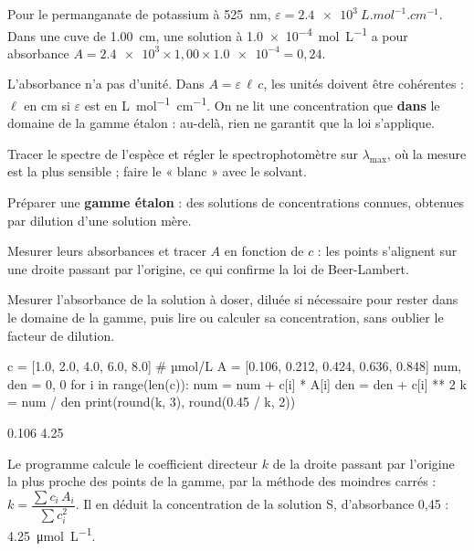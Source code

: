 \begin{exemple}
Pour le permanganate de potassium à \qty{525}{nm}, $\varepsilon=\qty{2,4e3}{L.mol^{-1}.cm^{-1}}$. Dans une cuve de \qty{1,00}{cm}, une solution à \qty{1,0e-4}{mol.L^{-1}}
a pour absorbance $A=\num{2.4e3}\times1{,}00\times\num{1.0e-4}=0{,}24$.
\end{exemple}
\begin{attention}
L'absorbance n'a pas d'unité. Dans $A=\varepsilon\,\ell\,c$, les unités doivent être cohérentes : $\ell$ en cm si $\varepsilon$ est en \unit{L.mol^{-1}.cm^{-1}}. On
ne lit une concentration que \textbf{dans} le domaine de la gamme étalon : au-delà, rien ne garantit que la loi s'applique.
\end{attention}
\begin{savoirfaire}
\begin{questions}
\item Tracer le spectre de l'espèce et régler le spectrophotomètre sur $\lambda_{\max}$, où la mesure est la plus sensible ;
faire le « blanc » avec le solvant.
\item Préparer une \textbf{gamme étalon} : des solutions de concentrations connues, obtenues par dilution d'une solution mère.
\item Mesurer leurs absorbances et tracer $A$ en fonction de $c$ : les points s'alignent sur une droite passant par l'origine,
ce qui confirme la loi de Beer-Lambert.
\item Mesurer l'absorbance de la solution à doser, diluée si nécessaire pour rester dans le domaine de la gamme, puis lire
ou calculer sa concentration, sans oublier le facteur de dilution.
\end{questions}
\end{savoirfaire}
\begin{codecote}[0.62]
\begin{pythoncol}
c = [1.0, 2.0, 4.0, 6.0, 8.0]        # µmol/L
A = [0.106, 0.212, 0.424, 0.636, 0.848]
num, den = 0, 0
for i in range(len(c)):
    num = num + c[i] * A[i]
    den = den + c[i] ** 2
k = num / den
print(round(k, 3), round(0.45 / k, 2))
\end{pythoncol}
\begin{consolecol}
0.106 4.25
\end{consolecol}
\cote
\fontsize{9.5}{12.5}\selectfont
{}\par\smallskip
Le programme calcule le coefficient directeur $k$ de la droite passant par l'origine la plus proche des points de la
gamme, par la méthode des moindres carrés : $k=\dfrac{\sum c_i\,A_i}{\sum c_i^2}$. Il en déduit la concentration de la solution
S, d'absorbance 0,45 : \qty{4,25}{\micro mol.L^{-1}}.
\end{codecote}
